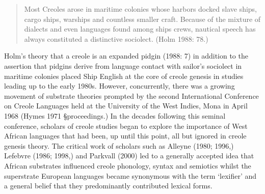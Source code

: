 \documentclass[12pt]{article}
\newenvironment{styleStandard}{\renewcommand\baselinestretch{1.0}\setlength\leftskip{0cm}\setlength\rightskip{0cm plus 1fil}\setlength\parindent{0cm}\setlength\parfillskip{0pt plus 1fil}\setlength\parskip{0in plus 1pt}\writerlistparindent\writerlistleftskip\leavevmode\normalfont\normalsize\writerlistlabel\ignorespaces}{\unskip\vspace{0in plus 1pt}\par}
\newcommand\writerlistleftskip{}
\newcommand\writerlistparindent{}
\newcommand\writerlistlabel{}
\begin{document}
\begin{quotation}
Most Creoles arose in maritime colonies whose harbors docked slave ships, cargo ships, warships and countless smaller craft. Because of the mixture of dialects and even languages found among ships{\textquotesingle} crews, nautical speech has always constituted a distinctive sociolect. (Holm 1988: 78.) 

\end{quotation}
\begin{styleStandard}
Holm’s theory that a creole is an expanded pidgin (1988: 7) in addition to the assertion that pidgins derive from language contact with sailor’s sociolect in maritime colonies placed Ship English at the core of creole genesis in studies leading up to the early 1980s. However, concurrently, there was a growing movement of substrate theories prompted by the second International Conference on Creole Languages held at the University of the West Indies, Mona in April 1968 (Hymes 1971 §proceedings.) In the decades following this seminal conference, scholars of creole studies began to explore the importance of West African languages that had been, up until this point, all but ignored in creole genesis theory. The critical work of scholars such as Alleyne (1980; 1996,) Lefebvre (1986; 1998,) and Parkvall (2000) led to a generally accepted idea that African substrates influenced creole phonology, syntax and semiotics whilst the superstrate European languages became synonymous with the term ‘lexifier’ and a general belief that they predominantly contributed lexical forms.
\end{styleStandard}
\end{document}
